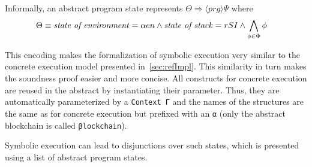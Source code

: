 \begin{comment}
  These rules never affect the goal formula to be asserted, and
  because (which must always be given), and $Ass$ can be any formula.
  Our construct specifys $Pre \Longrightarrow \langle p \rangle$ but
  not $Ass$ since it neither changes, nor has any implications for the
  validity of our rules \draft{other than the premisse holds with
    $Ass$ \emph{iff} the conclusion holds with it (i guess)}.

  This matches the sequent rule (R8) from \todo{cite lecture notes
    2010} for functional Michelson instructions, since here $x$ will
  be the new top stack element, which our DL always represents with a
  new variable, thus $\phi_x^{\hat{x}} \equiv \phi$.  \todo{not sure
    about control flow instructions \ldots}

  We will proof the soundness of these rules by showing that if an
  interpretation for $Pre$ is a valid interpretation for a concrete
  execution state with $i ; p$ left to be executed (i.e. stack values
  match and $Pre$ otherwise doesn't contradict itself), we can give an
  extension of that interpretation such that $I \land Pre'$ is a valid
  interpretation of the concrete state after execution of $i$.

  Since the extension of the interpretation is only for possible new
  variables that are not present in $Ass$, it follows from our
  soundness proof \draft{that our calculus is sound \ldots}.
\end{comment}

Informally, an abstract program state
represents $\Theta \Longrightarrow \langle prg \rangle \Psi$ where
\begin{align*}
	\Theta&\equiv	\text{\emph{state of environment}} = \alpha en
\land	\text{\emph{state of stack}} = rSI
\land	\bigwedge_{\phi \in \Phi} \phi
\end{align*}


This encoding makes the formalization of symbolic execution very similar to the concrete execution model
presented in~\autoref{sec:refImpl}.
This similarity in turn makes the soundness proof easier and more concise.
All constructs for concrete execution are reused in the abstract by
instantiating their  parameter.
Thus, they  are automatically parameterized by a \verb/Context Γ/ and the names of the
structures are the same as for concrete execution but prefixed with an \verb/α/
(only the abstract blockchain is called \verb/βlockchain/).


Symbolic execution can lead to disjunctions over such states, which is presented using
a list of abstract program states.
\AbstractUProgState

